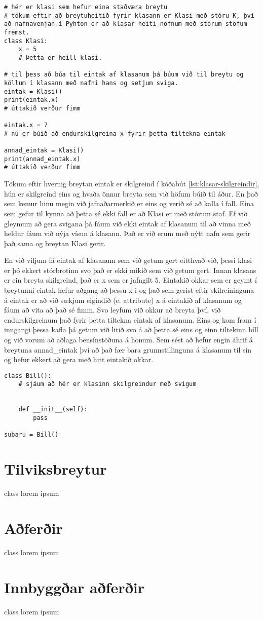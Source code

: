 \begin{lstlisting}[caption=Klasar skilgreindir, label=lst:klasar-skilgreindir]
# hér er klasi sem hefur eina staðværa breytu
# tökum eftir að breytuheitið fyrir klasann er Klasi með stóru K, því að nafnavenjan í Pyhton er að klasar heiti nöfnum með stórum stöfum fremst.
class Klasi:
	x = 5
	# Þetta er heill klasi.
	
# til þess að búa til eintak af klasanum þá búum við til breytu og köllum í klasann með nafni hans og setjum sviga.
eintak = Klasi()
print(eintak.x)
# úttakið verður fimm

eintak.x = 7
# nú er búið að endurskilgreina x fyrir þetta tiltekna eintak

annad_eintak = Klasi()
print(annad_eintak.x)
# úttakið verður fimm 
\end{lstlisting}

Tökum eftir hvernig breytan eintak er skilgreind í kóðabút \ref{lst:klasar-skilgreindir}, hún er skilgreind eins og hvaða önnur breyta sem við höfum búið til áður.
En það sem kemur hinu megin við jafnaðarmerkið er eins og verið sé að kalla í fall.
Eina sem gefur til kynna að þetta sé ekki fall er að Klasi er með stórum staf.
Ef við gleymum að gera svigana þá fáum við ekki eintak af klasanum til að vinna með heldur fáum við nýja vísun á klasann.
Það er við erum með nýtt nafn sem gerir það sama og breytan Klasi gerir.

En við viljum fá eintak af klasanum sem við getum gert eitthvað við, þessi klasi er þó ekkert stórbrotinn svo það er ekki mikið sem við getum gert.
Innan klasans er ein breyta skilgreind, það er x sem er jafngilt 5.
Eintakið okkar sem er geymt í breytunni eintak hefur aðgang að þessu x-i og það sem gerist eftir skilreininguna á eintak er að við sækjum eigindið (e. attribute) x á eintakið af klasanum og fáum að vita að það sé fimm.
Svo leyfum við okkur að breyta því, við endurskilgreinum það fyrir þetta tiltekna eintak af klasanum.
Eins og kom fram í inngangi þessa kafla þá getum við litið svo á að þetta sé eins og einn tiltekinn bíll og við vorum að aðlaga bensínstöðuna á honum.
Sem sést að hefur engin áhrif á breytuna annad\_eintak því að það fær bara grunnstillinguna á klasanum til sín og hefur ekkert að gera með hitt eintakið okkar.

\begin{lstlisting}[caption=Klasar skilgreindir með töfraaðferðinni \_\_init\_\_, label=lst:klasar-notkun]
class Bill():
	# sjáum að hér er klasinn skilgreindur með svigum
	
	
	def __init__(self):
		pass
		
subaru = Bill()
\end{lstlisting}

\section{Tilviksbreytur}\label{uk:klasar-tilviksbreytur}
class lorem ipsum

\section{Aðferðir}\label{uk:klasar-aðferðir}
class lorem ipsum

\section{Innbyggðar aðferðir}\label{uk:klasar-innbyggðar-aðferðir}
class lorem ipsum